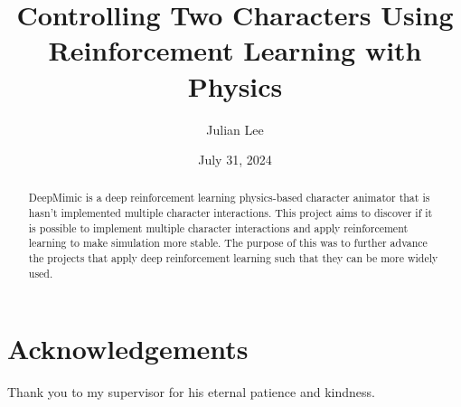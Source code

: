 \documentclass{l4proj}
\begin{document}
\title{Controlling Two Characters Using Reinforcement Learning with Physics} %
\author{Julian Lee}
\date{July 31, 2024}

\maketitle

\begin{abstract}
    DeepMimic is a deep reinforcement learning physics-based character animator that is hasn't implemented multiple character interactions. This project aims to discover if it is possible to implement multiple character interactions and apply reinforcement learning to make simulation more stable. The purpose of this was to further advance the projects that apply deep reinforcement learning such that they can be more widely used.
\end{abstract}

\chapter*{Acknowledgements}
%
%
Thank you to my supervisor for his eternal patience and kindness.

%
%
%
\educationalconsent
\end{document}
